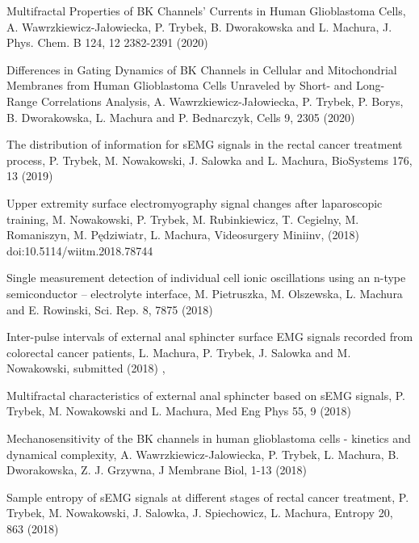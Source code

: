 \documentclass[11pt,a4paper,sans]{moderncv} %
\begin{document}
\begin{etaremune}  %
  \item Multifractal Properties of BK Channels’ Currents in Human Glioblastoma Cells, A. Wawrzkiewicz-Jałowiecka, P. Trybek, B. Dworakowska and L. Machura, J. Phys. Chem. B 124,  12  2382-2391  (2020)

\item Differences in Gating Dynamics of BK Channels in Cellular and Mitochondrial Membranes from Human Glioblastoma Cells Unraveled by Short- and Long-Range Correlations Analysis, A. Wawrzkiewicz-Jałowiecka, P. Trybek, P. Borys, B. Dworakowska, L. Machura and P. Bednarczyk, Cells 9,  2305 (2020)

\item The distribution of information for sEMG signals in the rectal cancer treatment process, P. Trybek, M. Nowakowski, J. Salowka and L. Machura, BioSystems 176,  13 (2019)

\item Upper extremity surface electromyography signal changes after laparoscopic training, M. Nowakowski, P. Trybek, M. Rubinkiewicz, T. Cegielny, M. Romaniszyn, M. Pędziwiatr, L. Machura, Videosurgery Miniinv,  (2018)  doi:10.5114/wiitm.2018.78744

\item Single measurement detection of individual cell ionic oscillations using an n-type semiconductor – electrolyte interface, M. Pietruszka, M. Olszewska, L. Machura and E. Rowinski, Sci. Rep. 8,  7875 (2018)

\item Inter-pulse intervals of external anal sphincter surface EMG signals recorded from colorectal cancer patients, L. Machura, P. Trybek, J. Salowka and M. Nowakowski, submitted (2018)
,
\item Multifractal characteristics of external anal sphincter based on sEMG signals, P. Trybek, M. Nowakowski and L. Machura, Med Eng Phys 55,  9 (2018)

\item Mechanosensitivity of the BK channels in human glioblastoma cells - kinetics and dynamical complexity, A. Wawrzkiewicz-Jalowiecka, P. Trybek, L. Machura, B. Dworakowska, Z. J. Grzywna, J Membrane Biol,  1-13 (2018)

\item  Sample entropy of sEMG signals at different stages of rectal cancer treatment, P. Trybek, M. Nowakowski, J. Salowka, J. Spiechowicz, L. Machura, Entropy 20,  863 (2018)


\end{etaremune}
\end{document}
